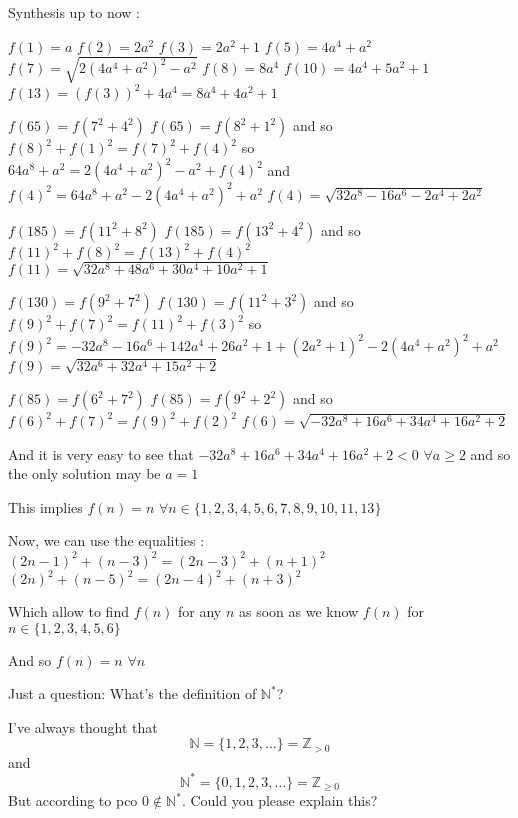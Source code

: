 \begin{solution}
Synthesis up to now :

$ f(1) = a$
$ f(2) = 2a^2$
$ f(3) = 2a^2 + 1$
$ f(5) = 4a^4 + a^2$
$ f(7) = \sqrt {2(4a^4 + a^2)^2 - a^2}$
$ f(8) = 8a^4$
$ f(10) = 4a^4 + 5a^2 + 1$
$ f(13) = (f(3))^2 + 4a^4 = 8a^4 + 4a^2 + 1$ 


$ f(65) = f(7^2 + 4^2)$
$ f(65) = f(8^2 + 1^2)$
and so $ f(8)^2 + f(1)^2 = f(7)^2 + f(4)^2$
so $ 64a^8 + a^2 = 2(4a^4 + a^2)^2 - a^2 + f(4)^2$
and $ f(4)^2 = 64a^8 + a^2 - 2(4a^4 + a^2)^2 + a^2$
$ f(4) = \sqrt {32a^8 - 16a^6 - 2a^4 + 2a^2}$


$ f(185) = f(11^2 + 8^2)$
$ f(185) = f(13^2 + 4^2)$
and so $ f(11)^2 + f(8 )^2 = f(13)^2 + f(4)^2$
$ f(11) = \sqrt {32a^8 + 48a^6 + 30a^4 + 10a^2 + 1}$

$ f(130) = f(9^2 + 7^2)$
$ f(130) = f(11^2 + 3^2)$
and so $ f(9)^2 + f(7)^2 = f(11)^2 + f(3)^2$
so $ f(9)^2 = - 32a^8 - 16a^6 + 142a^4 + 26a^2 + 1 + (2a^2 + 1)^2 - 2(4a^4 + a^2)^2 + a^2$
$ f(9) = \sqrt {32a^6 + 32a^4 + 15a^2 + 2}$


$ f(85) = f(6^2 + 7^2)$
$ f(85) = f(9^2 + 2^2)$
and so $ f(6)^2 + f(7)^2 = f(9)^2 + f(2)^2$
$ f(6) = \sqrt { - 32a^8 + 16a^6 + 34a^4 + 16a^2 + 2}$

And it is very easy to see that  $ - 32a^8 + 16a^6 + 34a^4 + 16a^2 + 2 < 0$ $ \forall a\ge 2$ and so the only solution may be $ a = 1$

This implies $ f(n) = n$ $ \forall n\in\{1,2,3,4,5,6,7,8,9,10,11,13\}$

Now, we can use the equalities  :
$ (2n - 1)^2 + (n - 3)^2 = (2n - 3)^2 + (n + 1)^2$
$ (2n)^2 + (n - 5)^2 = (2n - 4)^2 + (n + 3)^2$

Which allow to find $ f(n)$ for any $ n$ as soon as we know $ f(n)$ for $ n\in\{1,2,3,4,5,6\}$

And so $ \boxed{f(n) = n}$ $ \forall n$
\end{solution}



\begin{solution}
	Just a question:
What's the definition of $ \mathbb{N}^\ast$?

I've always thought that
\[ \mathbb{N} = \{ 1,2,3,\ldots \} = \mathbb{Z}_{>0}\] and
\[ \mathbb{N}^\ast = \{ 0,1,2,3,\ldots \} = \mathbb{Z}_{\geq 0}\]
But according to pco $ 0 \not\in \mathbb{N}^\ast$. Could you please explain this?
\end{solution}



